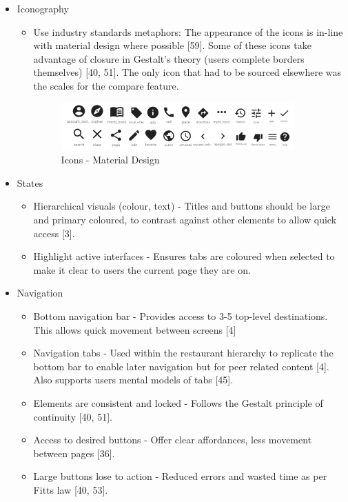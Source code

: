 \documentclass[a4 paper, 12pt]{article}
\begin{document}
\begin{itemize}
            \item Iconography
                \begin{itemize}
                    \item Use industry standards metaphors: The appearance of the icons is in-line with material design where possible [59]. Some of these icons take advantage of closure in Gestalt's theory (users complete borders themselves) [40, 51]. The only icon that had to be sourced elsewhere was the scales for the compare feature.  
                    \begin{figure} [H]
                        \centering
                        \includegraphics[width=0.9\textwidth, frame]
                            {./Med_Fidelity/Med_Report/images/material_icons.PNG}    
                        \caption{Icons - Material Design}
                    \end{figure}   
                \end{itemize}           

            \item States
            \begin{itemize}
                \item Hierarchical visuals (colour, text) - Titles and buttons should be large and primary coloured, to contrast against other elements to allow quick access [3].
                \item Highlight active interfaces - Ensures tabs are coloured when selected to make it clear to users the current page they are on.
            \end{itemize}

            \item Navigation
            \begin{itemize}                
                \item Bottom navigation bar - Provides access to 3-5 top-level destinations. This allows quick movement between screens [4]
                \item Navigation tabs - Used within the restaurant hierarchy to replicate the bottom bar to enable later navigation but for peer related content [4]. Also supports users mental models of tabs [45].
                \item Elements are consistent and locked - Follows the Gestalt principle of continuity [40, 51].
                \item Access to desired buttons - Offer clear affordances, less movement between pages [36].
                \item Large buttons lose to action - Reduced errors and wasted time as per Fitts law [40, 53].
            \end{itemize}
                

\end{itemize}
\end{document}
